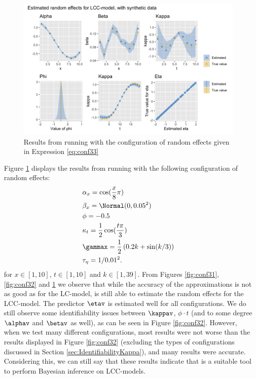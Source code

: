 \begin{figure}[h!]
    \centering
    \includegraphics[width=0.85\linewidth]{synthetic-data/Figures/effects-LCC-synthetic-3-3.png}
    \caption{Results from running \inlabru with the configuration of random effects given in Expression \ref{eq:conf33}}
    \label{fig:conf33}
\end{figure}
Figure \ref{fig:conf33} displays the results from running \inlabru with the following configuration of random effects:
\begin{equation}
    \begin{aligned}
        &\alpha_x = \cos(\frac{x}{8}\pi)\\
        &\beta_x = \Normal(0,0.05^2)\\
        &\phi = -0.5\\
        &\kappa_t = \frac{1}{2}\cos(\frac{t\pi}{3})\\
        &\gammax = \frac{1}{2}\left( 0.2k + \sin(k/3)\right)\\
        &\tau_{\eta} = 1/0.01^2.
    \end{aligned}
    \label{eq:conf33}
\end{equation}
for $x\in[1,10]$, $t \in [1,10]$ and $k \in [1,39]$. 
From Figures \ref{fig:conf31}, \ref{fig:conf32} and \ref{fig:conf33} we observe that while the accuracy of the approximations is not as good as for the LC-model, \inlabru is still able to estimate the random effects for the LCC-model. The predictor $\etav$ is estimated well for all configurations. We do still observe some identifiability issues between $\kappav$, $\phi \cdot t$ (and to some degree $\alphav$ and $\betav$ as well), as can be seen in Figure \ref{fig:conf32}. However, when we test many different configurations, most results were not worse than the results displayed in Figure \ref{fig:conf32} (excluding the types of configurations discussed in Section \ref{sec:IdentifiabilityKappa}), and many results were accurate.  Considering this, we can still say that these results indicate that \inlabru is a suitable tool to perform Bayesian inference on LCC-models. 
